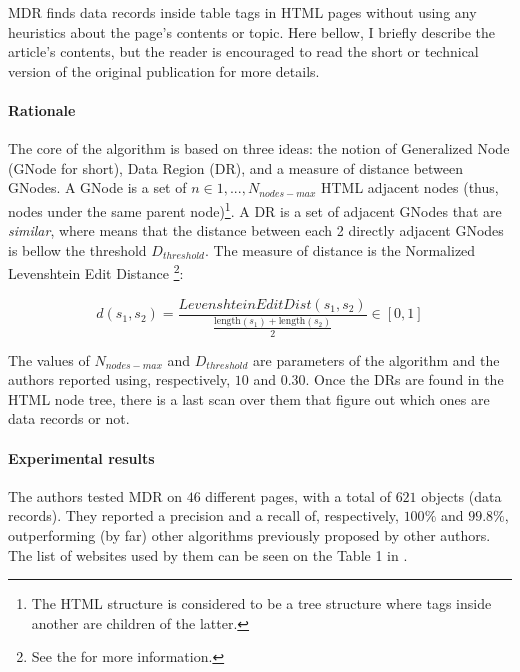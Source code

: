 \documentclass[11pt]{article}
\newcommand{\maxnodes}{N_{nodes-max}}
\newcommand{\dth}{D_{threshold}}
\begin{document}
MDR finds data records inside table tags in HTML pages without using any heuristics about the page's contents or topic. Here bellow, I briefly describe the article's contents, but the reader is encouraged to read the short \citep{mdr} or technical \citep{mdr-technical} version of the original publication for more details.


\paragraph{Rationale}

The core of the algorithm is based on three ideas: the notion of Generalized Node (GNode for short), Data Region (DR), and a measure of distance between GNodes. A GNode is a set of $n \in {1, ..., \maxnodes}$ HTML adjacent nodes (thus, nodes under the same parent node)\footnote{The HTML structure is considered to be a tree structure where tags inside another are children of the latter.}. A DR is a set of adjacent GNodes that are \emph{similar}, where  means that the distance between each 2 directly adjacent GNodes is bellow the threshold $\dth$. The measure of distance is the Normalized Levenshtein Edit Distance \footnote{See the \cite{lev-dist-wiki} for more information.}:

\begin{equation}\label{eq:dist}
    d\left(s_{1}, s_{2}\right)=\frac{LevenshteinEditDist\left(s_{1}, s_{2}\right)}{\frac{\text {length}\left(s_{1}\right)+\text {length}\left(s_{2}\right)}{2}} \in [0, 1]
\end{equation}

The values of $\maxnodes$ and $\dth$ are parameters of the algorithm and the authors reported using, respectively, $10$ and $0.30$. Once the DRs are found in the HTML node tree, there is a last scan over them that figure out which ones are data records or not.



\paragraph{Experimental results}

The authors tested MDR on $46$ different pages, with a total of $621$ objects (data records). They reported a precision and a recall of, respectively, $100\%$ and $99.8\%$, outperforming (by far) other algorithms previously proposed by other authors. The list of websites used by them can be seen on the Table 1 in \cite{mdr}. 
\end{document}
